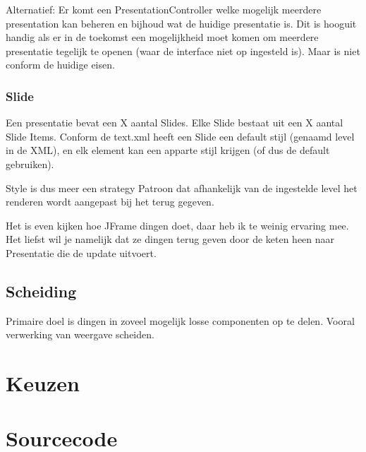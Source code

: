 \documentclass[a4paper]{article}
\begin{document}
Alternatief: Er komt een PresentationController welke mogelijk meerdere
presentation kan beheren en bijhoud wat de huidige presentatie is. Dit is
hooguit handig als er in de toekomst een mogelijkheid moet komen om meerdere
presentatie tegelijk te openen (waar de interface niet op ingesteld is). Maar is
niet conform de huidige eisen.

\subsubsection{Slide}
Een presentatie bevat een X aantal Slides. Elke Slide bestaat uit een X aantal
Slide Items. Conform de text.xml heeft een Slide een default stijl (genaamd
level in de XML), en elk element kan een apparte stijl krijgen (of dus de
default gebruiken).

Style is dus meer een strategy Patroon dat afhankelijk van de ingestelde level
het renderen wordt aangepast bij het terug gegeven.

Het is even kijken hoe JFrame dingen doet, daar heb ik te weinig ervaring mee.
Het liefst wil je namelijk dat ze dingen terug geven door de keten heen naar
Presentatie die de update uitvoert.

\subsection{Scheiding}
Primaire doel is dingen in zoveel mogelijk losse componenten op te delen.
Vooral verwerking van weergave scheiden.

\section{Keuzen}



\section{Sourcecode}
\end{document}

